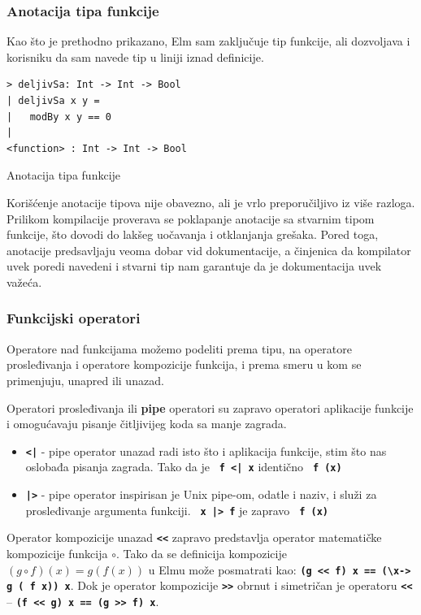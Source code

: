 \documentclass[12pt,oneside]{memoir}
\begin{document}
\subsubsection{Anotacija tipa funkcije}
Kao što je prethodno prikazano, Elm sam zaključuje tip funkcije, ali dozvoljava i korisniku
da sam navede tip u liniji iznad definicije.
\begin{listing}[!h]
\begin{verbatim}
> deljivSa: Int -> Int -> Bool
| deljivSa x y =
|   modBy x y == 0
|
<function> : Int -> Int -> Bool
\end{verbatim}
\caption{Anotacija tipa funkcije}
\end{listing}

Korišćenje anotacije tipova nije obavezno, ali je vrlo preporučiljivo iz više razloga.
Prilikom kompilacije proverava se poklapanje anotacije sa stvarnim tipom funkcije, što
dovodi do lakšeg uočavanja i otklanjanja grešaka. Pored toga, anotacije predsavljaju veoma
dobar vid dokumentacije, a činjenica da kompilator uvek poredi navedeni i stvarni tip nam
garantuje da je dokumentacija uvek važeća.

\subsubsection{Funkcijski operatori}
Operatore nad funkcijama možemo podeliti prema tipu, na operatore prosleđivanja i operatore
kompozicije funkcija, i prema smeru u kom se primenjuju, unapred ili unazad.

Operatori prosleđivanja ili \textbf{pipe} operatori su zapravo operatori aplikacije funkcije
i omogućavaju pisanje čitljivijeg koda sa manje zagrada.
\begin{itemize}
  \item \texttt{\textbf{<|}} - pipe operator unazad radi isto što i aplikacija funkcije, 
  stim što nas oslobađa pisanja zagrada. Tako da je \texttt{\textbf{ f <| x}} identično
  \texttt{\textbf{ f (x)}}
  \item \texttt{\textbf{|>}} - pipe operator inspirisan je Unix pipe-om, odatle i
  naziv, i služi za prosleđivanje argumenta funkciji. \texttt{\textbf{ x |> f}} je zapravo
  \texttt{\textbf{ f (x)}}
\end{itemize}

Operator kompozicije unazad \texttt{\textbf{<<}} zapravo predstavlja operator matematičke 
kompozicije funkcija \(\circ\). Tako da se definicija kompozicije \((g \circ f)(x) = g(f(x))\)
u Elmu može posmatrati kao: \texttt{\textbf{(g << f) x == (\textbackslash x\textunderscore ->
g ( f x\textunderscore)) x}}. Dok je operator kompozicije \texttt{\textbf{>>}} obrnut i
simetričan je operatoru \texttt{\textbf{<<}} -- \texttt{\textbf{(f << g) x == (g >> f) x}}.
\end{document}
